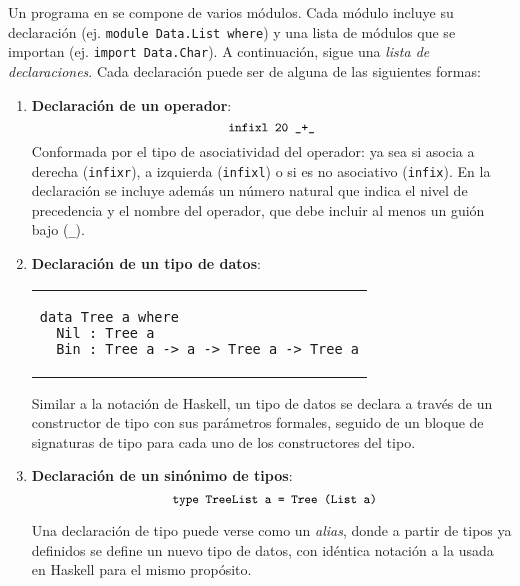 Un programa en \nuflo se compone de varios módulos.
Cada módulo incluye su declaración (ej. \verb|module Data.List where|)
y una lista de módulos que se importan (ej. \verb|import Data.Char|).
A continuación, sigue una {\em lista de declaraciones}.
Cada declaración puede ser de alguna de las siguientes formas:
\begin{enumerate}
  \item {\bf Declaración de un operador}:
      \[ {\small \texttt{infixl 20 $\_$+$\_$}} \]
    Conformada por el tipo de asociatividad del operador:
    ya sea si asocia a derecha (\verb|infixr|), a
    izquierda (\verb|infixl|)
    o si es no asociativo (\verb|infix|).
    En la declaración se incluye además
    un número natural que indica el nivel de precedencia
    y el nombre del operador, que debe incluir al menos un guión bajo (\verb|_|).
  \item {\bf Declaración de un tipo de datos}:
      \begin{center}
      \begin{tabular}{l}
      \begin{lstlisting}
data Tree a where
  Nil : Tree a
  Bin : Tree a -> a -> Tree a -> Tree a
      \end{lstlisting}
      \end{tabular}
      \end{center}
    Similar a la notación de Haskell, un tipo de datos
    se declara a través de un constructor de tipo con sus parámetros formales,
    seguido de un bloque de signaturas de tipo para cada uno
    de los constructores del tipo.

  \item {\bf Declaración de un sinónimo de tipos}:
      \[ {\small \texttt{ type TreeList a = Tree (List a)}} \]
      
    Una declaración de tipo puede verse como un {\em alias}, donde
    a partir de tipos ya definidos se define un nuevo tipo de datos,
    con idéntica notación a la usada en Haskell para el mismo propósito.


\end{enumerate}

